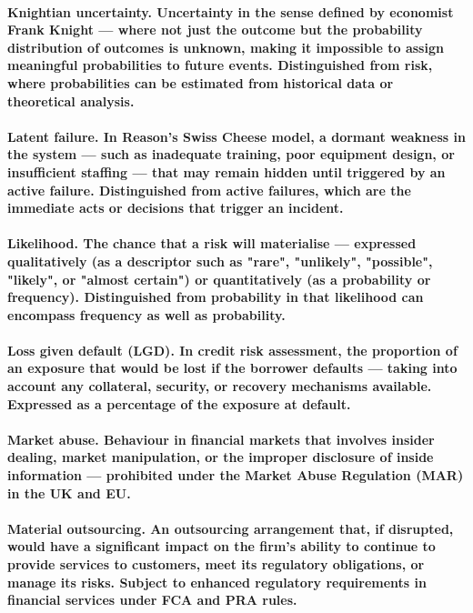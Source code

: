 \paragraph{\textbf{Knightian uncertainty}. Uncertainty in the sense defined by economist Frank Knight — where not just the outcome but the probability distribution of outcomes is unknown, making it impossible to assign meaningful probabilities to future events. Distinguished from risk, where probabilities can be estimated from historical data or theoretical analysis.}

\paragraph{\textbf{Latent failure}. In Reason's Swiss Cheese model, a dormant weakness in the system — such as inadequate training, poor equipment design, or insufficient staffing — that may remain hidden until triggered by an active failure. Distinguished from active failures, which are the immediate acts or decisions that trigger an incident.}

\paragraph{\textbf{Likelihood}. The chance that a risk will materialise — expressed qualitatively (as a descriptor such as "rare", "unlikely", "possible", "likely", or "almost certain") or quantitatively (as a probability or frequency). Distinguished from probability in that likelihood can encompass frequency as well as probability.}

\paragraph{\textbf{Loss given default (LGD)}. In credit risk assessment, the proportion of an exposure that would be lost if the borrower defaults — taking into account any collateral, security, or recovery mechanisms available. Expressed as a percentage of the exposure at default.}

\paragraph{\textbf{Market abuse}. Behaviour in financial markets that involves insider dealing, market manipulation, or the improper disclosure of inside information — prohibited under the Market Abuse Regulation (MAR) in the UK and EU.}

\paragraph{\textbf{Material outsourcing}. An outsourcing arrangement that, if disrupted, would have a significant impact on the firm's ability to continue to provide services to customers, meet its regulatory obligations, or manage its risks. Subject to enhanced regulatory requirements in financial services under FCA and PRA rules.}

